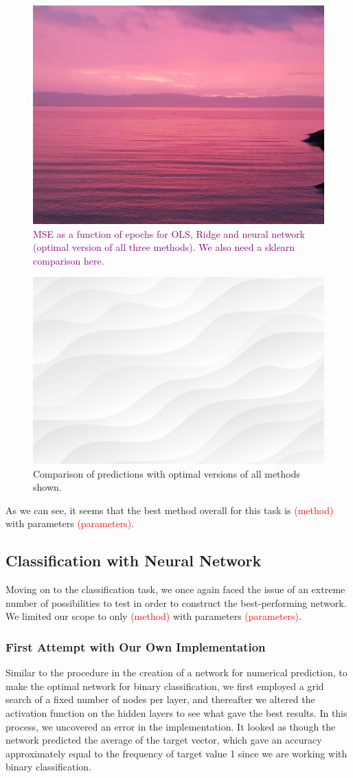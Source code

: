 \begin{figure}
    \centering
    \includegraphics[width=0.5\linewidth]{figures/placeholders/numericalprediction.png}
    \caption{\textcolor{purple}{MSE as a function of epochs for OLS, Ridge and neural network (optimal version of all three methods). We also need a sklearn comparison here.}}
    \label{fig:numericalprediction}
\end{figure}

\begin{figure}
    \centering
    \includegraphics[width=0.5\linewidth]{figures/placeholders/predictioncomparison.png}
    \caption{Comparison of predictions with optimal versions of all methods shown.}
    \label{fig:predictioncomparison}
\end{figure}

As we can see, it seems that the best method overall for this task is \textcolor{red}{(method)} with parameters \textcolor{red}{(parameters)}. 

\subsection{Classification with Neural Network}
Moving on to the classification task, we once again faced the issue of an extreme number of possibilities to test in order to construct the best-performing network. We limited our scope to only \textcolor{red}{(method)} with parameters \textcolor{red}{(parameters)}.

\subsubsection{First Attempt with Our Own Implementation}
Similar to the procedure in the creation of a network for numerical prediction, to make the optimal network for binary classification, we first employed a grid search of a fixed number of nodes per layer, and thereafter we altered the activation function on the hidden layers to see what gave the best results. In this process, we uncovered an error in the implementation. It looked as though the network predicted the average of the target vector, which gave an accuracy approximately equal to the frequency of target value 1 since we are working with binary classification. 


